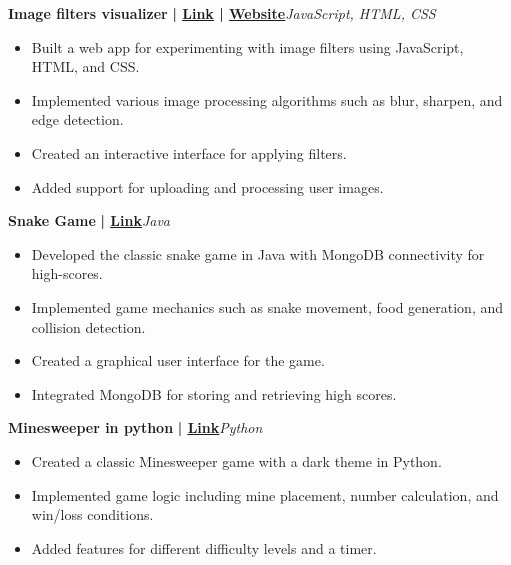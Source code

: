 \documentclass[a4paper]{article}
\begin{document}
          \vspace*{3mm}
      {\textbf{Image filters visualizer}}\textbf{ | \href{https://github.com/syedhuzaif199/image-filters-visualization}{\underline{Link}} | \href{https://syedhuzaif199.github.io/image-filters-visualization}{\underline{Website}}}\hfill{\sl JavaScript, HTML, CSS}\\
          \vspace{-1mm}
\begin{itemize} \itemsep -3pt
\item Built a web app for experimenting with image filters using JavaScript, HTML, and CSS.
\item Implemented various image processing algorithms such as blur, sharpen, and edge detection.
\item Created an interactive interface for applying filters.
\item Added support for uploading and processing user images.
\end{itemize}
          \vspace*{3mm}
      {\textbf{Snake Game}}\textbf{ | \href{https://github.com/syedhuzaif199/snake-mongo}{\underline{Link}}}\hfill{\sl Java}\\
          \vspace{-1mm}
\begin{itemize} \itemsep -3pt
\item Developed the classic snake game in Java with MongoDB connectivity for high-scores.
\item Implemented game mechanics such as snake movement, food generation, and collision detection.
\item Created a graphical user interface for the game.
\item Integrated MongoDB for storing and retrieving high scores.
\end{itemize}
          \vspace*{3mm}
      {\textbf{Minesweeper in python}}\textbf{ | \href{https://github.com/syedhuzaif199/minesweeper-python}{\underline{Link}}}\hfill{\sl Python}\\
          \vspace{-1mm}
\begin{itemize} \itemsep -3pt
\item Created a classic Minesweeper game with a dark theme in Python.
\item Implemented game logic including mine placement, number calculation, and win/loss conditions.
\item Added features for different difficulty levels and a timer.
\end{itemize}
\end{document}
